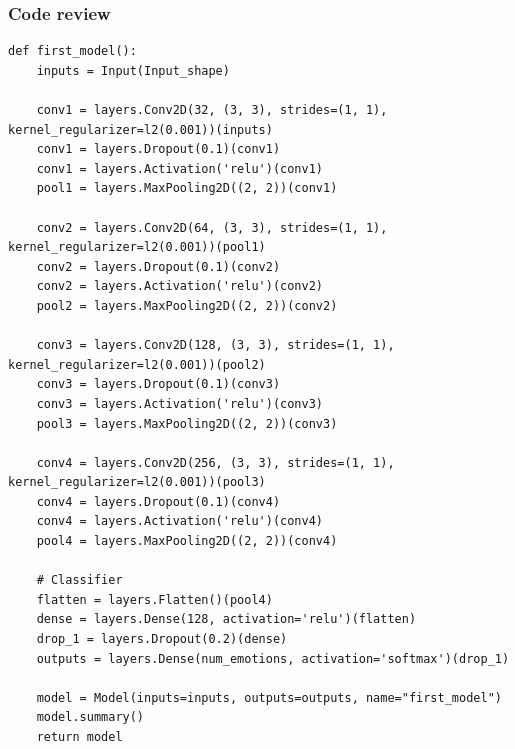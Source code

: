 \documentclass{article}
\begin{document}
\subsubsection{Code review}
\begin{lstlisting}
def first_model():
    inputs = Input(Input_shape)

    conv1 = layers.Conv2D(32, (3, 3), strides=(1, 1), kernel_regularizer=l2(0.001))(inputs)
    conv1 = layers.Dropout(0.1)(conv1)
    conv1 = layers.Activation('relu')(conv1)
    pool1 = layers.MaxPooling2D((2, 2))(conv1)

    conv2 = layers.Conv2D(64, (3, 3), strides=(1, 1), kernel_regularizer=l2(0.001))(pool1)
    conv2 = layers.Dropout(0.1)(conv2)
    conv2 = layers.Activation('relu')(conv2)
    pool2 = layers.MaxPooling2D((2, 2))(conv2)

    conv3 = layers.Conv2D(128, (3, 3), strides=(1, 1), kernel_regularizer=l2(0.001))(pool2)
    conv3 = layers.Dropout(0.1)(conv3)
    conv3 = layers.Activation('relu')(conv3)
    pool3 = layers.MaxPooling2D((2, 2))(conv3)

    conv4 = layers.Conv2D(256, (3, 3), strides=(1, 1), kernel_regularizer=l2(0.001))(pool3)
    conv4 = layers.Dropout(0.1)(conv4)
    conv4 = layers.Activation('relu')(conv4)
    pool4 = layers.MaxPooling2D((2, 2))(conv4)

    # Classifier
    flatten = layers.Flatten()(pool4)
    dense = layers.Dense(128, activation='relu')(flatten)
    drop_1 = layers.Dropout(0.2)(dense)
    outputs = layers.Dense(num_emotions, activation='softmax')(drop_1)

    model = Model(inputs=inputs, outputs=outputs, name="first_model")
    model.summary()
    return model
\end{lstlisting}
\end{document}
